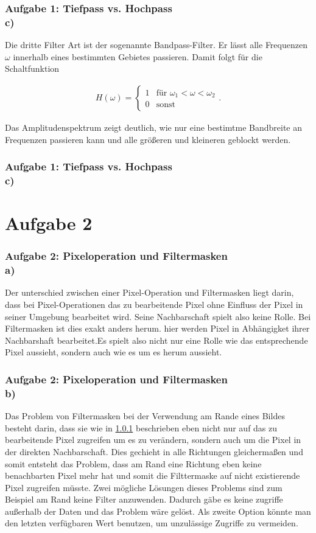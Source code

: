 \documentclass[accentcolor=tud9c,colorbacktitle,inverttitle,landscape,german,presentation,t]{tudbeamer}
\begin{document}
	\begin{frame}
	\frametitle{Aufgabe 1: Tiefpass vs. Hochpass \\ c)}
	Die dritte Filter Art ist der sogenannte Bandpass-Filter. Er l\"asst alle Frequenzen $\omega$ innerhalb eines bestimmten Gebietes passieren. Damit folgt f\"ur die Schaltfunktion
	
	\begin{align*}
	H(\omega) = \left\{\begin{array}{rl}1 & \textrm{f\"ur } \omega_1 < \omega < \omega_2 \\ 0 & \textrm{sonst} \end{array}\right. .	
\end{align*}	

Das Amplitudenspektrum %
zeigt deutlich, wie nur eine bestimtme Bandbreite an Frequenzen passieren kann und alle gr\"o\ss eren und kleineren geblockt werden.
\end{frame}

\begin{frame}
\frametitle{Aufgabe 1: Tiefpass vs. Hochpass \\ c)}


	\end{frame}
	
\section{Aufgabe 2}
	\begin{frame}
		\frametitle{Aufgabe 2: Pixeloperation und Filtermasken \\ a)}
			\label{2_a}
			Der unterschied zwischen einer Pixel-Operation und Filtermasken liegt darin, dass bei Pixel-Operationen das zu bearbeitende Pixel ohne Einfluss der Pixel in seiner Umgebung bearbeitet wird. Seine Nachbarschaft spielt also keine Rolle. Bei Filtermasken ist dies exakt anders herum. hier werden Pixel in Abh\"angigket ihrer Nachbarshaft bearbeitet.Es spielt also nicht nur eine Rolle wie das entsprechende Pixel aussieht, sondern auch wie es um es herum aussieht.
	\end{frame}

	\begin{frame}
		\frametitle{Aufgabe 2: Pixeloperation und Filtermasken \\ b)}
		Das Problem von Filtermasken bei der Verwendung am Rande eines Bildes besteht darin, dass sie wie in \ref{2_a} beschrieben eben nicht nur auf das zu bearbeitende Pixel zugreifen um es  zu ver\"andern, sondern auch um die Pixel in der direkten Nachbarschaft. Dies gechieht in alle Richtungen gleicherma\ss en und somit entsteht das Problem, dass am Rand eine Richtung eben keine benachbarten Pixel mehr hat und somit die Filttermaske auf nicht existierende Pixel zugreifen m\"usste. Zwei m\"ogliche L\"osungen dieses Problems sind zum Beispiel am Rand keine Filter anzuwenden. Dadurch g\"abe es keine zugriffe au\ss erhalb der Daten und das Problem w\"are gel\"ost. Als zweite Option k\"onnte man den letzten verf\"ugbaren Wert benutzen, um unzul\"assige Zugriffe zu vermeiden. 
	\end{frame}
	
\end{document}
